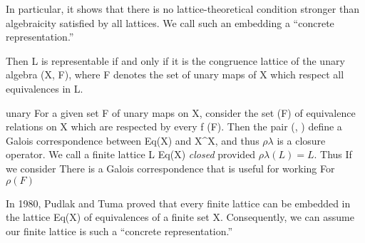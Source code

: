 In particular,
it shows that there is no lattice-theoretical condition stronger than algebraicity
satisfied by all lattices.  We
call such an embedding a ``concrete representation.'' 

Then L is representable if and only if it is the
congruence lattice of the unary algebra (X, F), where F denotes the set of unary maps
of X which respect all equivalences in L.   

unary 
For a given set F of unary maps on X, consider the set \rho(F) of equivalence
relations on X which are respected by every f \in \rho(F).  Then the pair (\lambda,
\rho) define a Galois correspondence between Eq(X) and X^X, and thus $\rho\lambda$ is
a closure operator.  We call a finite lattice L \leq Eq(X) \emph{closed} provided
$\rho\lambda(L) = L$.  Thus If we consider There is a Galois correspondence that is
useful for working For  $\rho(F)$



In 1980, Pudlak and Tuma proved that every finite lattice can be
embedded in the lattice Eq(X) of equivalences of a finite set X. Consequently, we can
assume our finite lattice is such a ``concrete representation.''
